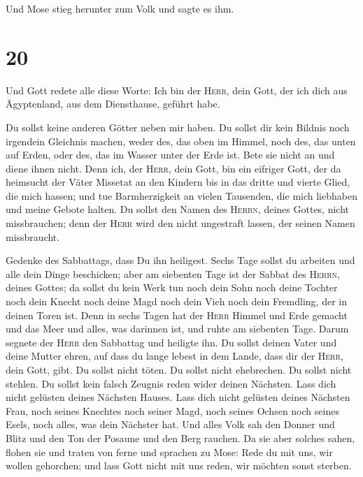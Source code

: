  Und Mose stieg herunter zum Volk und sagte es ihm.

\hypertarget{section-19}{%
\section{20}\label{section-19}}

 Und Gott redete alle diese Worte:  Ich bin
der \textsc{Herr}, dein Gott, der ich dich aus Ägyptenland, aus dem
Diensthause, geführt habe.

 Du sollst keine anderen Götter neben mir haben.
 Du sollst dir kein Bildnis noch irgendein Gleichnis
machen, weder des, das oben im Himmel, noch des, das unten auf Erden,
oder des, das im Wasser unter der Erde ist.  Bete sie
nicht an und diene ihnen nicht. Denn ich, der \textsc{Herr}, dein Gott,
bin ein eifriger Gott, der da heimsucht der Väter Missetat an den
Kindern bis in das dritte und vierte Glied, die mich hassen;
 und tue Barmherzigkeit an vielen Tausenden, die mich
liebhaben und meine Gebote halten.  Du sollst den Namen
des \textsc{Herrn}, deines Gottes, nicht missbrauchen; denn der
\textsc{Herr} wird den nicht ungestraft lassen, der seinen Namen
missbraucht.

 Gedenke des Sabbattags, dass Du ihn heiligest.
 Sechs Tage sollst du arbeiten und alle dein Dinge
beschicken;  aber am siebenten Tage ist der Sabbat des
\textsc{Herrn}, deines Gottes; da sollst du kein Werk tun noch dein Sohn
noch deine Tochter noch dein Knecht noch deine Magd noch dein Vieh noch
dein Fremdling, der in deinen Toren ist.  Denn in sechs
Tagen hat der \textsc{Herr} Himmel und Erde gemacht und das Meer und
alles, was darinnen ist, und ruhte am siebenten Tage. Darum segnete der
\textsc{Herr} den Sabbattag und heiligte ihn.  Du sollst
deinen Vater und deine Mutter ehren, auf dass du lange lebest in dem
Lande, dass dir der \textsc{Herr}, dein Gott, gibt.  Du
sollst nicht töten.  Du sollst nicht ehebrechen.
 Du sollst nicht stehlen.  Du sollst kein
falsch Zeugnis reden wider deinen Nächsten.  Lass dich
nicht gelüsten deines Nächsten Hauses. Lass dich nicht gelüsten deines
Nächsten Frau, noch seines Knechtes noch seiner Magd, noch seines Ochsen
noch seines Esels, noch alles, was dein Nächster hat. 
Und alles Volk sah den Donner und Blitz und den Ton der Posaune und den
Berg rauchen. Da sie aber solches sahen, flohen sie und traten von ferne
 und sprachen zu Mose: Rede du mit uns, wir wollen
gehorchen; und lass Gott nicht mit uns reden, wir möchten sonst sterben.


